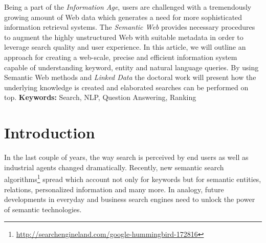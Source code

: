 


%
%
%

Being a part of the \emph{Information Age}, users are challenged with a tremendously growing amount of Web data which generates a need for more sophisticated information retrieval systems.
The \emph{Semantic Web} provides necessary procedures to augment the highly unstructured Web with suitable metadata in order to leverage search quality and user experience.
In this article, we will outline an approach for creating a web-scale, precise and efficient information system capable of understanding keyword, entity and natural language queries.
By using Semantic Web methods and \emph{Linked Data} the doctoral work will present how the underlying knowledge is created and elaborated searches can be performed on top.
\textbf{Keywords:} Search, NLP, Question Answering, Ranking

\section{Introduction}

In the last couple of years, the way search is perceived by end users as well as industrial agents changed dramatically.
Recently, new semantic search algorithms\footnote{\url{http://searchengineland.com/google-hummingbird-172816}} spread which account not only for keywords but for semantic entities, relations, personalized information and many more.
In analogy, future developments in everyday and business search engines need to unlock the power of semantic technologies.

